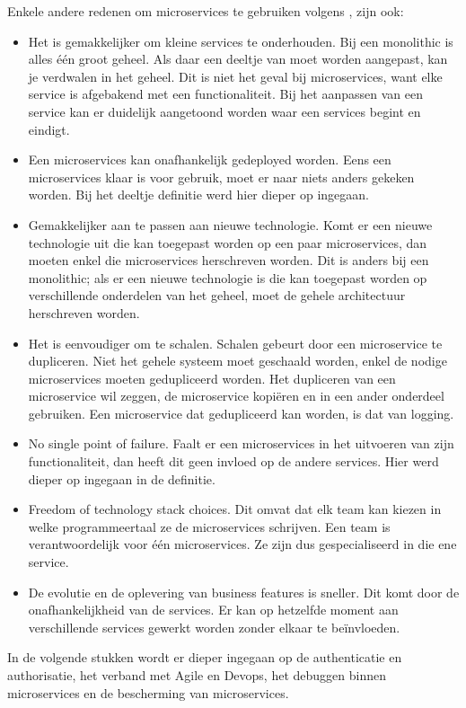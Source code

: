 Enkele andere redenen om microservices te gebruiken volgens \textcite{Koukia2018}, zijn ook:
\begin{itemize}
	\item Het is gemakkelijker om kleine services te onderhouden. Bij een monolithic is alles één groot geheel. Als daar een deeltje van moet worden aangepast, kan je verdwalen in het geheel. Dit is niet het geval bij microservices, want elke service is afgebakend met een functionaliteit. Bij het aanpassen van een service kan er duidelijk aangetoond worden waar een services begint en eindigt. 
	\item Een microservices kan onafhankelijk gedeployed worden. Eens een microservices klaar is voor gebruik, moet er naar niets anders gekeken worden. Bij het deeltje definitie  werd hier dieper op ingegaan.
	\item Gemakkelijker aan te passen aan nieuwe  technologie. Komt er een nieuwe  technologie uit die kan toegepast worden op een paar microservices, dan moeten enkel die microservices herschreven worden. Dit is anders bij een monolithic; als er een nieuwe  technologie is die kan toegepast worden op verschillende onderdelen van het geheel, moet de gehele architectuur herschreven worden.
	\item Het is eenvoudiger om te schalen. Schalen gebeurt door een microservice te dupliceren. Niet het gehele systeem moet geschaald worden, enkel de nodige microservices moeten gedupliceerd worden. Het dupliceren van een microservice wil zeggen, de microservice kopiëren en in een ander onderdeel gebruiken. Een microservice dat gedupliceerd kan worden, is dat van logging. 
	\item No single point of failure. Faalt er een microservices in het uitvoeren van zijn functionaliteit, dan heeft dit geen invloed op de andere services. Hier werd dieper op ingegaan in de definitie.
	\item Freedom of technology stack choices. Dit omvat dat elk team kan kiezen in  welke programmeertaal ze de microservices schrijven. Een team is verantwoordelijk voor één microservices. Ze zijn dus gespecialiseerd in die ene service. 
	\item De evolutie en de oplevering van business features is sneller. Dit komt door de onafhankelijkheid van de services. Er kan op hetzelfde moment aan verschillende services gewerkt worden zonder elkaar te beïnvloeden.
\end{itemize}


In de volgende stukken wordt er dieper ingegaan op de authenticatie en authorisatie, het verband met Agile en Devops, het debuggen binnen microservices en de bescherming van microservices.

